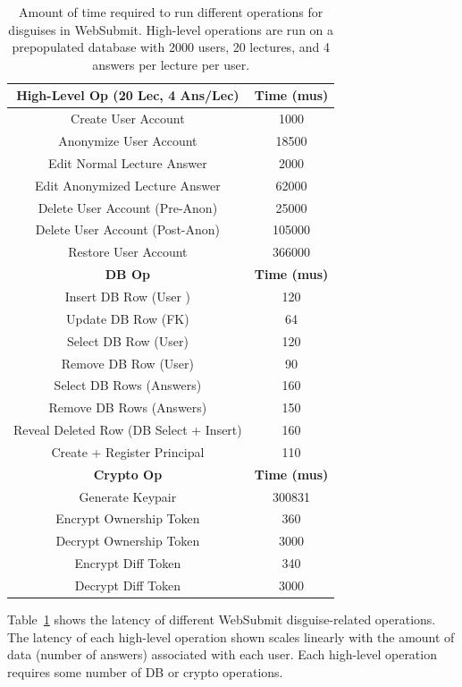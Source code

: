 \begin{table}[t!]
\begin{center}
\begin{tabular}{ c c }
    \textbf{High-Level Op (20 Lec, 4 Ans/Lec)} & \textbf{Time (mus)}\\
\hline
    Create User Account & 1000\\
    Anonymize User Account & 18500\\
    Edit Normal Lecture Answer & 2000 \\
    Edit Anonymized Lecture Answer & 62000 \\
    Delete User Account (Pre-Anon) & 25000 \\
    Delete User Account (Post-Anon) & 105000 \\
    Restore User Account & 366000 \\
\hline
    \textbf{DB Op} & \textbf{Time (mus)}\\
\hline
Insert DB Row (User )& 120\\
Update DB Row (FK) & 64\\ 
Select DB Row (User) & 120\\
Remove DB Row (User) & 90\\
Select DB Rows (Answers) & 160\\
Remove DB Rows (Answers) & 150\\
Reveal Deleted Row (DB Select + Insert) & 160 \\
Create + Register Principal & 110\\
\hline
    \textbf{Crypto Op} & \textbf{Time (mus)}\\
\hline
Generate Keypair & 300831\\
Encrypt Ownership Token & 360\\
Decrypt Ownership Token & 3000\\
Encrypt Diff Token & 340\\
Decrypt Diff Token & 3000\\
\end{tabular}
\end{center}
\caption{Amount of time required to run different operations for disguises in WebSubmit. High-level
    operations are run on a prepopulated database with 2000 users, 20 lectures, and 4 answers per
    lecture per user.}
    \label{tab:opstats}
\end{table}

Table~\ref{tab:opstats} shows the latency of different WebSubmit disguise-related operations.  The
latency of each high-level operation shown scales linearly with the amount of data (\ie number of
answers) associated with each user. Each high-level operation requires some number of DB or crypto
operations.

